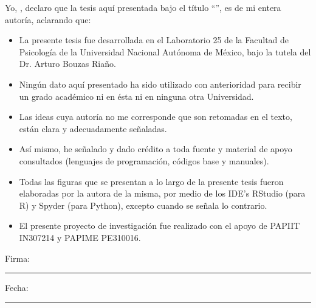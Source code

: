 \documentclass[
12pt, %
spanish, %
singlespacing, %
headsepline, %
]{MastersDoctoralThesis} %
\begin{document}
\begin{declaration}
\addchaptertocentry{\authorshipname} %
\noindent Yo, \authorname, declaro que la tesis aquí presentada bajo el título \enquote{\ttitle}, es de mi entera autoría, aclarando que:\\

\begin{itemize} 
\item La presente tesis fue desarrollada en el Laboratorio 25 de la Facultad de Psicología de la Universidad Nacional Autónoma de México, bajo la tutela del Dr. Arturo Bouzas Riaño. 
\item Ningún dato aquí presentado ha sido utilizado con anterioridad para recibir un grado académico ni en ésta ni en ninguna otra Universidad. 
\item Las ideas cuya autoría no me corresponde que son retomadas en el texto, están clara y adecuadamente señaladas. 
\item Así mismo, he señalado y dado crédito a toda fuente y material de apoyo consultados (lenguajes de programación, códigos base y manuales).
\item Todas las figuras que se presentan a lo largo de la presente tesis fueron elaboradas por la autora de la misma, por medio de los IDE's RStudio (para R) y Spyder (para Python), excepto cuando se señala lo contrario.
\item El presente proyecto de investigación fue realizado con el apoyo de PAPIIT IN307214 y PAPIME PE310016.\\
\end{itemize}
 
\noindent Firma:\\
\rule[0.5em]{25em}{0.5pt} %
 
\noindent Fecha:\\
\rule[0.5em]{25em}{0.5pt} %
\end{declaration}

\cleardoublepage

\end{document}

